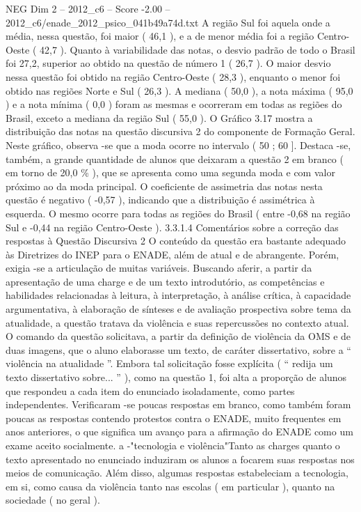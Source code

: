 \begin{textsample}{NEG Dim 2 – 2012\_c6 – Score -2.00 – 2012\_c6/enade\_2012\_psico\_041b49a74d.txt}
A região Sul foi aquela onde a média, nessa questão, foi maior ( 46,1 ), e a de menor média foi a região Centro-Oeste ( 42,7 ).
Quanto à variabilidade das notas, o desvio padrão de todo o Brasil foi 27,2, superior ao obtido na questão de número 1 ( 26,7 ).
O maior desvio nessa questão foi obtido na região Centro-Oeste ( 28,3 ), enquanto o menor foi obtido nas regiões Norte e Sul ( 26,3 ).
A mediana ( 50,0 ), a nota máxima ( 95,0 ) e a nota mínima ( 0,0 ) foram as mesmas e ocorreram em todas as regiões do Brasil, exceto a mediana da região Sul ( 55,0 ).
O Gráfico 3.17 mostra a distribuição das notas na questão discursiva 2 do componente de Formação Geral.
Neste gráfico, observa -se que a moda ocorre no intervalo ( 50 ; 60 ].
Destaca -se, também, a grande quantidade de alunos que deixaram a questão 2 em branco ( em torno de 20,0 \% ), que se apresenta como uma segunda moda e com valor próximo ao da moda principal.
O coeficiente de assimetria das notas nesta questão é negativo ( -0,57 ), indicando que a distribuição é assimétrica à esquerda.
O mesmo ocorre para todas as regiões do Brasil ( entre -0,68 na região Sul e -0,44 na região Centro-Oeste ). 3.3.1.4 Comentários sobre a correção das respostas à Questão Discursiva 2 O conteúdo da questão era bastante adequado às Diretrizes do INEP para o ENADE, além de atual e de abrangente.
Porém, exigia -se a articulação de muitas variáveis.
Buscando aferir, a partir da apresentação de uma charge e de um texto introdutório, as competências e habilidades relacionadas à leitura, à interpretação, à análise crítica, à capacidade argumentativa, à elaboração de sínteses e de avaliação prospectiva sobre tema da atualidade, a questão tratava da violência e suas repercussões no contexto atual.
O comando da questão solicitava, a partir da definição de violência da OMS e de duas imagens, que o aluno elaborasse um texto, de caráter dissertativo, sobre a “ violência na atualidade ”.
Embora tal solicitação fosse explícita ( “ redija um texto dissertativo sobre... ” ), como na questão 1, foi alta a proporção de alunos que respondeu a cada item do enunciado isoladamente, como partes independentes.
Verificaram -se poucas respostas em branco, como também foram poucas as respostas contendo protestos contra o ENADE, muito frequentes em anos anteriores, o que significa um avanço para a afirmação do ENADE como um exame aceito socialmente. a -"tecnologia e violência"Tanto as charges quanto o texto apresentado no enunciado induziram os alunos a focarem suas respostas nos meios de comunicação.
Além disso, algumas respostas estabeleciam a tecnologia, em si, como causa da violência tanto nas escolas ( em particular ), quanto na sociedade ( no geral ).

\end{textsample}
